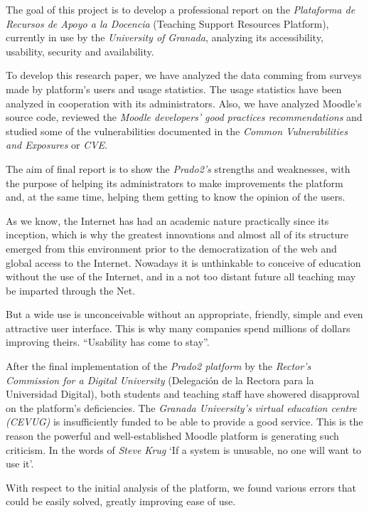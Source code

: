 {{The goal of this project is to develop a professional report on the \textit{Plataforma de Recursos de Apoyo a la Docencia} (Teaching Support Resources Platform), currently in use by the \textit{University of Granada}, analyzing its accessibility, usability, security and availability.

\bigskip
To develop this research paper, we have analyzed the data comming from surveys made by platform's users and usage statistics. The usage statistics have been analyzed in cooperation with its administrators. Also, we have analyzed Moodle's source code, reviewed the \textit{Moodle developers' good practices recommendations} and studied some of the vulnerabilities documented in the \textit{Common Vulnerabilities and Exposures} or \textit{CVE}.

\bigskip
The aim of final report is to show the \textit{Prado2's} strengths and weaknesses, with the purpose of helping its administrators to make improvements the platform and, at the same time, helping them getting to know the opinion of the users.

\bigskip
As we know, the Internet has had an academic nature practically since its inception, which is why the greatest innovations and almost all of its structure emerged from this environment prior to the democratization of the web and global access to the Internet.  Nowadays it is unthinkable to conceive of education without the use of the Internet, and in a not too distant future all teaching may be imparted through the Net. 

\bigskip
But a wide use is unconceivable without an appropriate, friendly, simple and even attractive user interface. This is why many companies spend millions of dollars improving theirs. ``Usability has come to stay''.\cite{jakonielsen} 

\bigskip
After the final implementation of the \textit{Prado2 platform} by the \textit{Rector’s Commission for a Digital University} (Delegación de la Rectora para la Universidad Digital), both students and teaching staff have showered disapproval on the platform’s deficiencies. The \textit{Granada University’s virtual education centre (CEVUG)} is insufficiently funded to be able to provide a good service. This is the reason the powerful and well-established Moodle platform is  generating such criticism. In the words of \textit{Steve Krug} ‘If a system is unusable, no one will want to use it’\cite{stevekrug}.  

\bigskip
With respect to the initial analysis of the platform, we found various errors that could be easily solved, greatly improving ease of use.

}}
